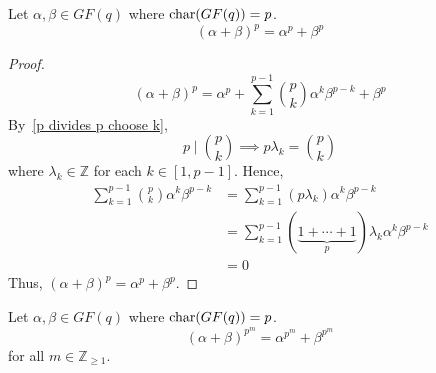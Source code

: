 \begin{thmbox}
    \begin{theorem}
        Let $ \alpha,\beta\in GF(q) $ where $ \operatorname{char}(GF(q))=p $.
        \[ (\alpha + \beta)^p=\alpha^p+\beta^p \]
    \end{theorem}
\end{thmbox}

\begin{proof}
    \[ (\alpha + \beta)^p=\alpha^p+\sum\limits_{k=1}^{p-1}
        \binom{p}{k}\alpha^k\beta^{p-k}+\beta^p \]
    By~\ref{p divides p choose k},
    \[ p\mid \binom{p}{k}\implies p\lambda_k=\binom{p}{k} \]
    where $ \lambda_k\in\mathbb{Z} $ for each $ k\in[1,p-1] $. Hence,
    \begin{align*}
        \sum\limits_{k=1}^{p-1}\binom{p}{k}\alpha^k\beta^{p-k}
         & = \sum\limits_{k=1}^{p-1} (p\lambda_k) \alpha^k\beta^{p-k}                          \\
         & =\sum\limits_{k=1}^{p-1} (\underbrace{1+\cdots+1}_{p})\lambda_k \alpha^k\beta^{p-k} \\
         & =0
    \end{align*}
    Thus, $ (\alpha + \beta)^p=\alpha^p+\beta^p $.
\end{proof}

\begin{thmbox}
    \begin{corollary}
        Let $ \alpha,\beta\in GF(q) $ where $ \operatorname{char}(GF(q))=p $.
        \[ (\alpha+\beta)^{p^m}=\alpha^{p^m}+\beta^{p^m} \]
        for all $ m\in\mathbb{Z}_{\geqslant 1} $.
    \end{corollary}
\end{thmbox}

